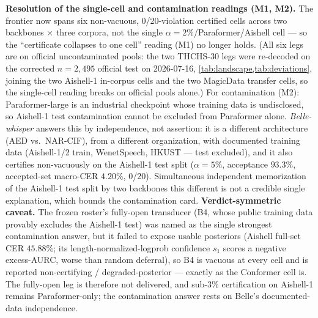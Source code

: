 \documentclass[11pt]{article}
\begin{document}
\textbf{Resolution of the single-cell and contamination readings (M1, M2).} The frontier
now spans six non-vacuous, 0/20-violation certified cells across two backbones
$\times$ three corpora, not the single $\alpha{=}2\%$/Paraformer/Aishell cell --- so the
``certificate collapses to one cell'' reading (M1) no longer holds. (All six legs are on
official uncontaminated pools: the two THCHS-30 legs were re-decoded on the corrected
$n{=}2{,}495$ official test on 2026-07-16, \cref{tab:landscape,tab:deviations}, joining the
two Aishell-1 in-corpus cells and the two MagicData transfer cells, so the single-cell
reading breaks on official pools alone.) For contamination
(M2): Paraformer-large is an industrial checkpoint whose training data is undisclosed, so
Aishell-1 test contamination cannot be excluded from Paraformer alone. \emph{Belle-whisper}
answers this by independence, not assertion: it is a different architecture (AED vs.\
NAR-CIF), from a different organization, with documented training data (Aishell-1/2
train, WenetSpeech, HKUST --- test excluded), and it also certifies non-vacuously on
the Aishell-1 test split ($\alpha{=}5\%$, acceptance $93.3\%$, accepted-set macro-CER
$4.20\%$, 0/20). Simultaneous independent memorization of the Aishell-1 test split by
two backbones this different is not a credible single explanation, which bounds the
contamination card. \textbf{Verdict-symmetric caveat.} The frozen roster's fully-open
transducer (B4, whose public training data provably excludes the Aishell-1 test) was named
as the single strongest contamination answer, but it failed to expose usable posteriors
(Aishell full-set CER $45.88\%$; its length-normalized-logprob confidence $s_1$ scores a
negative excess-AURC, worse than random deferral), so B4 is vacuous at every cell and
is reported non-certifying / degraded-posterior --- exactly as the Conformer cell is. The
fully-open leg is therefore not delivered, and sub-$3\%$ certification on Aishell-1 remains
Paraformer-only; the contamination answer rests on Belle's documented-data independence.
\end{document}
